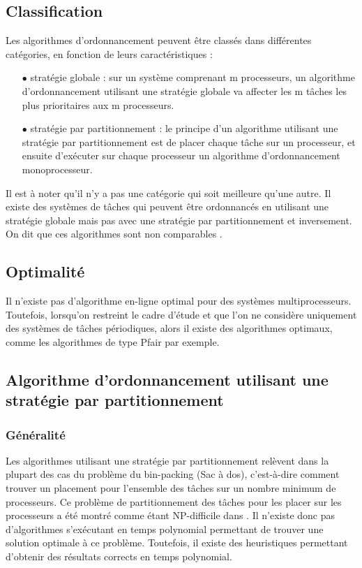 \subsection{Classification}
\vspace{-1cm}
Les algorithmes d'ordonnancement peuvent être classés dans différentes catégories, en fonction de leurs caractéristiques :
\begin{itemize}
\item[$\bullet$] stratégie globale : sur un système comprenant m processeurs, un algorithme d'ordonnancement utilisant une stratégie globale va affecter les m tâches les plus prioritaires aux m processeurs.
\item[$\bullet$] stratégie par partitionnement : le principe d'un algorithme utilisant une stratégie par partitionnement est de placer chaque tâche sur un processeur, et ensuite d'exécuter sur chaque processeur un algorithme d'ordonnancement monoprocesseur.
\end{itemize}
\indent Il est à noter qu'il n'y a pas une catégorie qui soit meilleure qu'une autre. Il existe des systèmes de tâches qui peuvent être ordonnancés en utilisant une stratégie globale mais pas avec une stratégie par partitionnement et inversement. On dit que ces algorithmes sont non comparables \cite{LW82}.

\subsection{Optimalité}
\vspace{-1cm}
\begin{theoreme}[\cite{HL92}]
Il n'existe pas d'algorithme en-ligne optimal pour des systèmes multiprocesseurs. Toutefois, lorsqu'on restreint le cadre d'étude et que l'on ne considère uniquement des systèmes de tâches périodiques, alors il existe des algorithmes optimaux, comme les algorithmes de type Pfair par exemple.
\end{theoreme}

\subsection{Algorithme d'ordonnancement utilisant une stratégie par partitionnement}
\subsubsection{Généralité}
\vspace{-1cm}
Les algorithmes utilisant une stratégie par partitionnement relèvent dans la plupart des cas du problème du bin-packing (Sac à dos), c'est-à-dire comment trouver un placement pour l'ensemble des tâches sur un nombre minimum de processeurs.
Ce problème de partitionnement des tâches pour les placer sur les processeurs a été montré comme étant NP-difficile dans \cite{LW82}. Il n'existe donc pas d'algorithmes s'exécutant en temps polynomial permettant de trouver une solution optimale à ce problème. Toutefois, il existe des heuristiques permettant d'obtenir des résultats corrects en temps polynomial.

